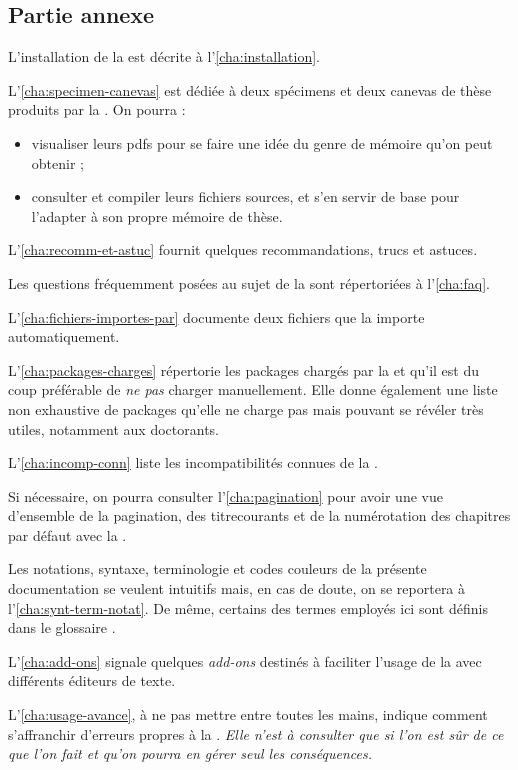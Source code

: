 \subsection{Partie annexe}
\label{sec:partie-annexe}

L'installation de la \yatcl{} est décrite à l'\vref{cha:installation}.

L'\vref{cha:specimen-canevas} est dédiée à deux spécimens et deux canevas de thèse
produits par la \yatcl{}. On pourra :
\begin{itemize}
\item visualiser leurs \glspl{pdf} pour se faire une idée du genre de mémoire
  qu'on peut obtenir ;
\item consulter et compiler leurs fichiers sources, et s'en servir de base pour
  l'adapter à son propre mémoire de thèse.
\end{itemize}

L'\vref{cha:recomm-et-astuc} fournit quelques recommandations, trucs et
astuces.

Les questions fréquemment posées au sujet de la \yatcl{} sont répertoriées
à l'\vref{cha:faq}.

L'\vref{cha:fichiers-importes-par} documente deux fichiers que la \yatcl{}
importe automatiquement.

L'\vref{cha:packages-charges} répertorie les packages chargés par la \yatcl{}
et qu'il est du coup préférable de \emph{ne pas} charger manuellement. Elle
donne également une liste non exhaustive de packages qu'elle ne charge pas mais
pouvant se révéler très utiles, notamment aux doctorants.

L'\vref{cha:incomp-conn} liste les incompatibilités connues de la \yatcl{}.

Si nécessaire, on pourra consulter l'\vref{cha:pagination} pour avoir une vue
d'ensemble de la \gls{pagination}, des \glspl{titrecourant} et de la
numérotation des chapitres par défaut avec la \yatcl{}.

Les notations, syntaxe, terminologie et codes couleurs de la présente
documentation se veulent intuitifs mais, en cas de doute, on se reportera
à l'\vref{cha:synt-term-notat}. De même, certains des termes employés ici sont
définis dans le glossaire .

L'\vref{cha:add-ons} signale quelques \emph{add-ons} destinés à faciliter
l'usage de la \yatcl{} avec différents éditeurs de texte.

L'\vref{cha:usage-avance}, à ne pas mettre entre toutes les mains, indique
comment s'affranchir d'erreurs propres à la \yatcl{}. \emph{Elle n'est
  à consulter que si l'on est sûr de ce que l'on fait et qu'on pourra en gérer
  \emph{seul} les conséquences.}

